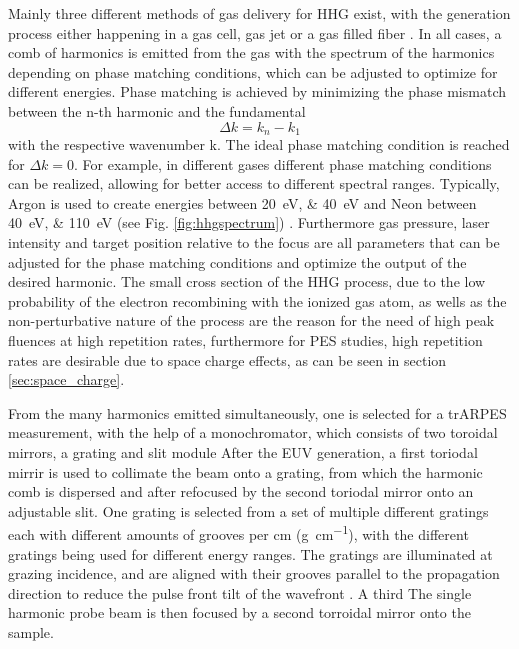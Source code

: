 Mainly three different methods of gas delivery for HHG exist, with the generation process either happening in a gas cell, gas jet or a gas filled fiber \cite{paul_quasi-phase-matched_2003, heckl_high_2009, sudmeyer_femtosecond_2008, roser_131w220fs_2005}.
In all cases, a comb of harmonics is emitted from the gas with the spectrum of the harmonics depending on phase matching conditions, which can be adjusted to optimize for different energies.
Phase matching is achieved by minimizing the phase mismatch between the n-th harmonic and the fundamental
\begin{equation}
	\Delta k = k_n - k_1
\end{equation}
with the respective wavenumber k.
The ideal phase matching condition is reached for $\Delta k=0$.
For example, in different gases different phase matching conditions can be realized, allowing for better access to different spectral ranges.
Typically, Argon is used to create energies between \qtylist{20; 40}{\electronvolt} and Neon between \qtylist{40; 110}{\electronvolt} (see Fig. \ref{fig:hhgspectrum}) \cite{rudawski_high-flux_2013}.
Furthermore gas pressure, laser intensity and target position relative to the focus are all parameters that can be adjusted for the phase matching conditions and optimize the output of the desired harmonic.
The small cross section of the HHG process, due to the low probability of the electron recombining with the ionized gas atom, as wells as the non-perturbative nature of the process are the reason for the need of high peak fluences at high repetition rates, furthermore for PES studies, high repetition rates are desirable due to space charge effects, as can be seen in section \ref{sec:space_charge}.

From the many harmonics emitted simultaneously, one is selected for a trARPES measurement, with the help of a monochromator, which consists of two toroidal mirrors, a grating and slit module
After the EUV generation, a first toriodal mirrir is used to collimate the beam onto a grating, from which the harmonic comb is dispersed and after refocused by the second toriodal mirror onto an adjustable slit.
One grating is selected from a set of multiple different gratings each with different amounts of grooves per \unit{cm} (\unit{g\per\cm}), with the different gratings being used for different energy ranges.
The gratings are illuminated at grazing incidence, and are aligned with their grooves parallel to the propagation direction to reduce the pulse front tilt of the wavefront \cite{poletto_time-preserving_2010}.
A third The single harmonic probe beam is then focused by a second torroidal mirror onto the sample.

